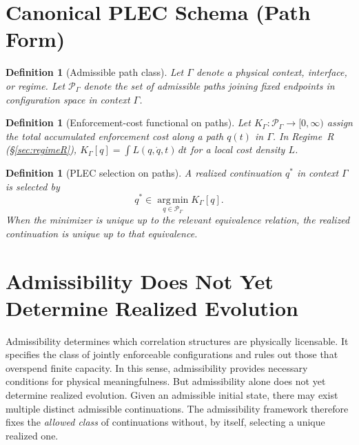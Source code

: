 \documentclass[11pt]{article}
\newtheorem{definition}[theorem]{Definition}
\begin{document}
\section{Canonical PLEC Schema (Path Form)}\label{sec:plec}

\begin{definition}[Admissible path class]
Let $\Gamma$ denote a physical context, interface, or regime. Let $\mathcal{P}_{\Gamma}$
denote the set of admissible paths joining fixed endpoints in configuration space
in context $\Gamma$.
\end{definition}

\begin{definition}[Enforcement-cost functional on paths]
Let $K_{\Gamma} : \mathcal{P}_{\Gamma} \to [0,\infty)$ assign the total accumulated
enforcement cost along a path $q(t)$ in $\Gamma$. In Regime~R (\S\ref{sec:regimeR}),
$K_{\Gamma}[q] = \int L(q,\dot q,t)\,dt$ for a local cost density $L$.
\end{definition}

\begin{definition}[PLEC selection on paths]
A realized continuation $q^{\ast}$ in context $\Gamma$ is selected by
\[
q^{\ast} \in \operatorname*{arg\,min}_{q \in \mathcal{P}_{\Gamma}} K_{\Gamma}[q].
\]
When the minimizer is unique up to the relevant equivalence relation, the realized
continuation is unique up to that equivalence.
\end{definition}

\section{Admissibility Does Not Yet Determine Realized Evolution}

Admissibility determines which correlation structures are physically licensable.
It specifies the class of jointly enforceable configurations and rules out those
that overspend finite capacity. In this sense, admissibility provides necessary
conditions for physical meaningfulness. But admissibility alone does not yet
determine realized evolution. Given an admissible initial state, there may exist
multiple distinct admissible continuations. The admissibility framework therefore
fixes the \emph{allowed class} of continuations without, by itself, selecting a
unique realized one.
\end{document}
